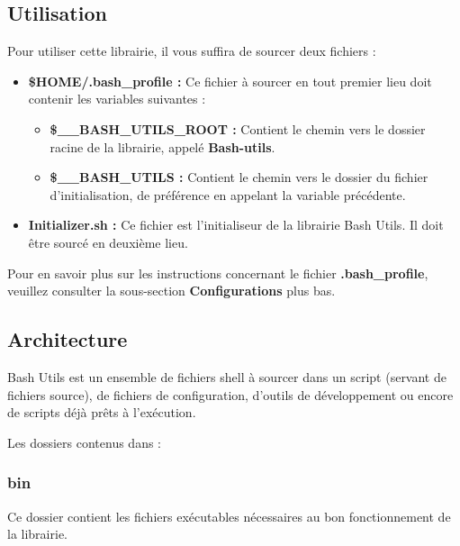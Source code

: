 \documentclass[a4paper,10pt]{article}
\begin{document}
\subsection{Utilisation}\color{white}
Pour utiliser cette librairie, il vous suffira de sourcer deux fichiers :
\begin{itemize}
    \item \color{orange}\textbf{\$HOME\color{lime}/.bash\_profile\color{white} :} \color{white} Ce fichier à sourcer en tout premier lieu doit contenir les variables suivantes :
    \begin{itemize}
        \item \color{orange}\textbf{\$\_\_BASH\_UTILS\_ROOT\color{white} :} \color{white} Contient le chemin vers le dossier racine de la librairie, appelé \color{lime}\textbf{Bash-utils}\color{white}.
        \item \color{orange}\textbf{\$\_\_BASH\_UTILS\color{white} :} \color{white} Contient le chemin vers le dossier du fichier d'initialisation, de préférence en appelant la variable précédente.\linebreak
    \end{itemize}

    \item \color{lime}\textbf{Initializer.sh\color{white} :} \color{white} Ce fichier est l'initialiseur de la librairie Bash Utils. Il doit être sourcé en deuxième lieu.

\end{itemize}
	Pour en savoir plus sur les instructions concernant le fichier \color{lime}\textbf{.bash\_profile}\color{white}, veuillez consulter la sous-section \textbf{Configurations} plus bas.


\color{green}
\subsection{Architecture}\color{white}
Bash Utils est un ensemble de fichiers shell à sourcer dans un script (servant de fichiers source), de fichiers de configuration, d'outils de développement ou encore de scripts déjà prêts à l'exécution.

Les dossiers contenus dans  :
\color{blue}
\subsubsection{bin}\color{white}
Ce dossier contient les fichiers exécutables nécessaires au bon fonctionnement de la librairie.

\color{blue}
\end{document}
